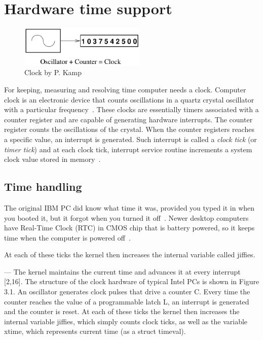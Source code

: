 
\chapter{Hardware time support}
\begin{figure}
	\centering
	\includegraphics[width=6cm,keepaspectratio]{fig/clock.png}
	\caption{Clock by P. Kamp}
	\label{fig:hw-clock}
\end{figure}
For keeping, measuring and resolving time computer needs a clock.
Computer clock is an electronic device that counts oscillations in a
quartz crystal oscillator with a particular frequency~\cite{thesis-sync}.
These clocks are essentially timers associated with a counter register and
are capable of generating hardware interrupts.
The counter register counts the oscillations of the crystal.
When the counter registers reaches a specific value,
an interrupt is generated.
Such interrupt is called a {\it{clock tick}} (or {\it{timer tick}}) and at each clock tick,
interrupt service routine increments a system clock value stored in memory~\cite{thesis-sync}.

\section{Time handling}
The original IBM PC did know what time it was, provided you typed it in when you booted it,
but it forgot when you turned it off~\cite{timecounters}.
Newer desktop computers %
have Real-Time Clock (RTC) in CMOS chip that is battery powered,
so it keeps time when the computer is powered off~\cite{timecounters}.


At each of these ticks the kernel then increases the internal variable called jiffies.

---
The kernel maintains the current time and advances it at every interrupt [2,16].
The structure of the clock hardware of typical Intel PCs is shown in Figure 3.1.
An oscillator generates clock pulses that drive a counter C.
Every time the counter reaches the value of a programmable latch L,
an interrupt is generated and the counter is reset.
At each of these ticks the kernel then increases the internal variable jiffies,
which simply counts clock ticks, as well as the variable xtime,
which represents current time (as a struct timeval).

